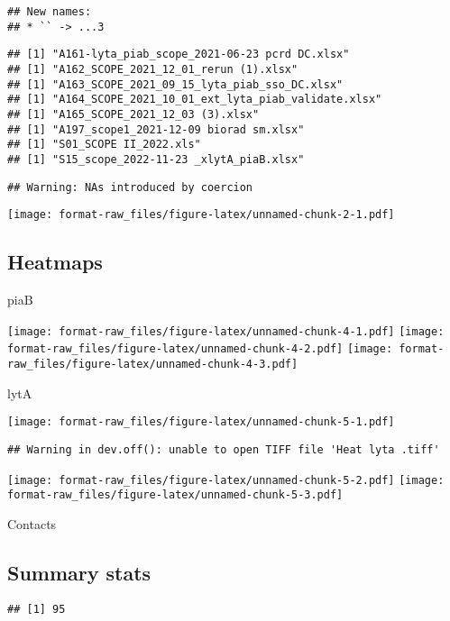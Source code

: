 \documentclass[
]{article}
\begin{document}
\begin{verbatim}
## New names:
## * `` -> ...3
\end{verbatim}

\begin{verbatim}
## [1] "A161-lyta_piab_scope_2021-06-23 pcrd DC.xlsx"
## [1] "A162_SCOPE_2021_12_01_rerun (1).xlsx"
## [1] "A163_SCOPE_2021_09_15_lyta_piab_sso_DC.xlsx"
## [1] "A164_SCOPE_2021_10_01_ext_lyta_piab_validate.xlsx"
## [1] "A165_SCOPE_2021_12_03 (3).xlsx"
## [1] "A197_scope1_2021-12-09 biorad sm.xlsx"
## [1] "S01_SCOPE II_2022.xls"
## [1] "S15_scope_2022-11-23 _xlytA_piaB.xlsx"
\end{verbatim}

\begin{verbatim}
## Warning: NAs introduced by coercion
\end{verbatim}

\texttt{[image: format-raw\_files/figure-latex/unnamed-chunk-2-1.pdf]}

\hypertarget{heatmaps}{%
\subsection{Heatmaps}\label{heatmaps}}

piaB

\texttt{[image: format-raw\_files/figure-latex/unnamed-chunk-4-1.pdf]}
\texttt{[image: format-raw\_files/figure-latex/unnamed-chunk-4-2.pdf]}
\texttt{[image: format-raw\_files/figure-latex/unnamed-chunk-4-3.pdf]}

lytA

\texttt{[image: format-raw\_files/figure-latex/unnamed-chunk-5-1.pdf]}

\begin{verbatim}
## Warning in dev.off(): unable to open TIFF file 'Heat lyta .tiff'
\end{verbatim}

\texttt{[image: format-raw\_files/figure-latex/unnamed-chunk-5-2.pdf]}
\texttt{[image: format-raw\_files/figure-latex/unnamed-chunk-5-3.pdf]}

Contacts

\hypertarget{summary-stats}{%
\subsection{Summary stats}\label{summary-stats}}

\begin{verbatim}
## [1] 95
\end{verbatim}
\end{document}
